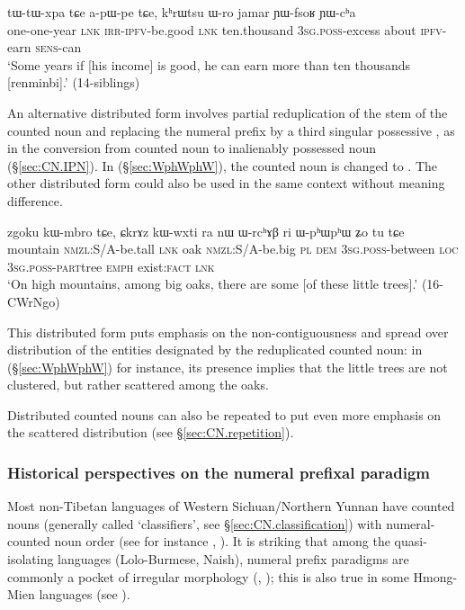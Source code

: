 \begin{exe}
\ex  \label{ex:tWtWxpa}
\gll   tɯ-tɯ-xpa tɕe a-pɯ-pe tɕe, kʰrɯtsu ɯ-ro jamar ɲɯ-fsoʁ ɲɯ-cʰa \\
one-one-year  \textsc{lnk} \textsc{irr}-\textsc{ipfv}-be.good \textsc{lnk} ten.thousand \textsc{3sg}.\textsc{poss}-excess about \textsc{ipfv}-earn \textsc{sens}-can \\ 
\glt `Some years if [his income] is good, he can earn more than ten thousands [renminbi].' (14-siblings)
\end{exe}

An alternative distributed form involves partial reduplication of the stem of the counted noun and replacing the numeral prefix by a third singular possessive , as in the conversion from counted noun to inalienably possessed noun (§\ref{sec:CN.IPN}). In (§\ref{sec:WphWphW}), the counted noun  is changed to . The other distributed form  could also be used in the same context without meaning difference. 

\begin{exe}
\ex \label{sec:WphWphW}
\gll zgoku kɯ-mbro tɕe, ɕkrɤz kɯ-wxti ra nɯ ɯ-rcʰɤβ ri ɯ-pʰɯ\redp{}pʰɯ ʑo tu tɕe \\
mountain \textsc{nmzl}:S/A-be.tall \textsc{lnk} oak \textsc{nmzl}:S/A-be.big \textsc{pl} \textsc{dem} \textsc{3sg}.\textsc{poss}-between \textsc{loc} \textsc{3sg}.\textsc{poss}-\textsc{part}\redp{}tree \textsc{emph} exist:\textsc{fact} \textsc{lnk} \\
\glt `On high mountains, among big oaks, there are some [of these little trees].' (16-CWrNgo)
\end{exe}   

This distributed form puts emphasis on the non-contiguousness and spread over distribution of the entities designated by the reduplicated counted noun: in (§\ref{sec:WphWphW}) for instance, its presence implies that the little trees are not clustered, but rather scattered among the oaks.

Distributed counted nouns can also be repeated to put even more emphasis on the scattered distribution (see §\ref{sec:CN.repetition}).

\subsubsection{Historical perspectives on the numeral prefixal paradigm} \label{sec:num.prefix.paradigm.history}
Most non-Tibetan languages of Western Sichuan/Northern Yunnan have counted nouns (generally called `classifiers', see §\ref{sec:CN.classification}) with numeral-counted noun order (see for instance \citealt{zhang14classifiers}, \citealt[163--194]{michaud17yongning}).  It is striking that among the quasi-isolating languages (Lolo-Burmese, Naish), numeral prefix paradigms are commonly a pocket of irregular morphology (\citealt{bradley05numerals}, \citealt{michaud11cl}); this is also true in some Hmong-Mien  languages (see \citealt{gerner10classifier.isolating}).

